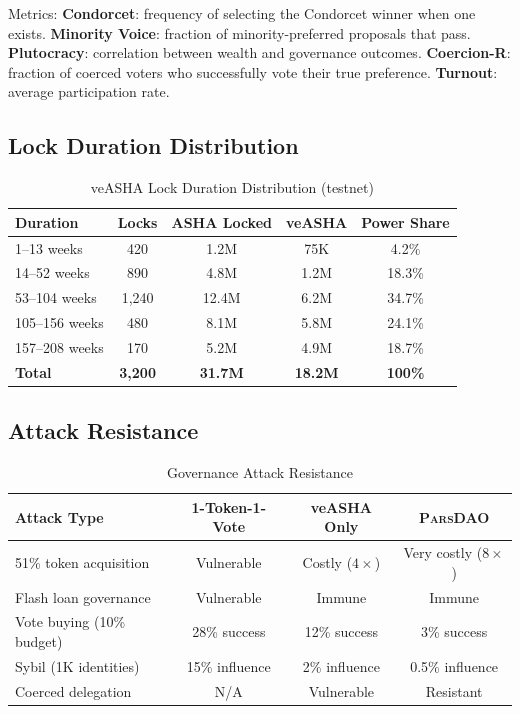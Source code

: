 \documentclass[11pt,a4paper]{article}
\newcommand{\parsdao}{\textsc{ParsDAO}\xspace}
\begin{document}
Metrics: \textbf{Condorcet}: frequency of selecting the Condorcet winner when one exists. \textbf{Minority Voice}: fraction of minority-preferred proposals that pass. \textbf{Plutocracy}: correlation between wealth and governance outcomes. \textbf{Coercion-R}: fraction of coerced voters who successfully vote their true preference. \textbf{Turnout}: average participation rate.

\subsection{Lock Duration Distribution}

\begin{table}[H]
\centering
\caption{veASHA Lock Duration Distribution (testnet)}
\label{tab:locks}
\begin{tabular}{lcccc}
\toprule
\textbf{Duration} & \textbf{Locks} & \textbf{ASHA Locked} & \textbf{veASHA} & \textbf{Power Share} \\
\midrule
1--13 weeks & 420 & 1.2M & 75K & 4.2\% \\
14--52 weeks & 890 & 4.8M & 1.2M & 18.3\% \\
53--104 weeks & 1{,}240 & 12.4M & 6.2M & 34.7\% \\
105--156 weeks & 480 & 8.1M & 5.8M & 24.1\% \\
157--208 weeks & 170 & 5.2M & 4.9M & 18.7\% \\
\midrule
\textbf{Total} & \textbf{3{,}200} & \textbf{31.7M} & \textbf{18.2M} & \textbf{100\%} \\
\bottomrule
\end{tabular}
\end{table}

\subsection{Attack Resistance}

\begin{table}[H]
\centering
\caption{Governance Attack Resistance}
\label{tab:attacks}
\begin{tabular}{lccc}
\toprule
\textbf{Attack Type} & \textbf{1-Token-1-Vote} & \textbf{veASHA Only} & \textbf{\parsdao} \\
\midrule
51\% token acquisition & Vulnerable & Costly ($4\times$) & Very costly ($8\times$) \\
Flash loan governance & Vulnerable & Immune & Immune \\
Vote buying (10\% budget) & 28\% success & 12\% success & 3\% success \\
Sybil (1K identities) & 15\% influence & 2\% influence & 0.5\% influence \\
Coerced delegation & N/A & Vulnerable & Resistant \\
\bottomrule
\end{tabular}
\end{table}
\end{document}
